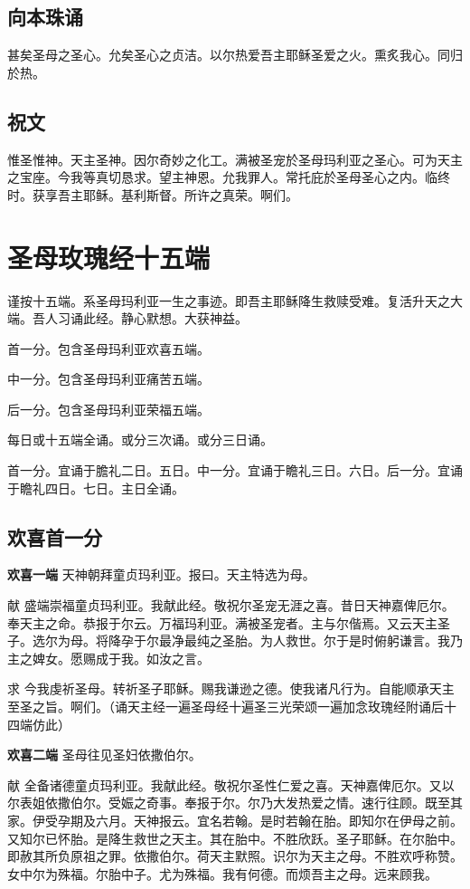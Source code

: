 \documentclass[UTF8,17pt]{ctexart}
\begin{document}
\subsection{向本珠诵}

甚矣圣母之圣⼼。允矣圣⼼之贞洁。以尔热爱吾主耶稣圣爱之⽕。熏炙我⼼。同归於热。

\subsection{祝⽂}

惟圣惟神。天主圣神。因尔奇妙之化⼯。满被圣宠於圣母玛利亚之圣⼼。可为天主之宝座。今我等真切恳求。望主神恩。允我罪⼈。常托庇於圣母圣⼼之内。临终时。获享吾主耶稣。基利斯督。所许之真荣。啊们。

\section{圣母玫瑰经⼗五端}

谨按⼗五端。系圣母玛利亚⼀⽣之事迹。即吾主耶稣降⽣救赎受难。复活升天之⼤端。吾⼈习诵此经。静⼼默想。⼤获神益。

⾸⼀分。包含圣母玛利亚欢喜五端。

中⼀分。包含圣母玛利亚痛苦五端。

后⼀分。包含圣母玛利亚荣福五端。

每⽇或⼗五端全诵。或分三次诵。或分三⽇诵。

⾸⼀分。宜诵于膽礼⼆⽇。五⽇。中⼀分。宜诵于瞻礼三⽇。六⽇。后⼀分。宜诵于瞻礼四⽇。七⽇。主⽇全诵。\Cross

\subsection{欢喜⾸⼀分}

\textbf{欢喜⼀端} \quad 天神朝拜童贞玛利亚。报曰。天主特选为母。

献 \quad 盛端崇福童贞玛利亚。我献此经。敬祝尔圣宠⽆涯之喜。昔⽇天神嘉俾厄尔。奉天主之命。恭报于尔云。万福玛利亚。满被圣宠者。主与尔偕焉。又云天主圣⼦。选尔为母。将降孕于尔最净最纯之圣胎。为⼈救世。尔于是时俯躬谦⾔。我乃主之婢⼥。愿赐成于我。如汝之⾔。

求 \quad 今我虔祈圣母。转祈圣⼦耶稣。赐我谦逊之德。使我诸凡⾏为。⾃能顺承天主⾄圣之旨。啊们。（诵天主经⼀遍圣母经⼗遍圣三光荣颂⼀遍加念玫瑰经附诵后⼗四端仿此）

\textbf{欢喜⼆端} \quad 圣母往见圣妇依撒伯尔。

献 \quad 全备诸德童贞玛利亚。我献此经。敬祝尔圣性仁爱之喜。天神嘉俾厄尔。又以尔表姐依撒伯尔。受娠之奇事。奉报于尔。尔乃⼤发热爱之情。速⾏往顾。既⾄其家。伊受孕期及六⽉。天神报云。宜名若翰。是时若翰在胎。即知尔在伊母之前。又知尔已怀胎。是降⽣救世之天主。其在胎中。不胜欣跃。圣⼦耶稣。在尔胎中。即赦其所负原祖之罪。依撒伯尔。荷天主默照。识尔为天主之母。不胜欢呼称赞。⼥中尔为殊福。尔胎中⼦。尤为殊福。我有何德。⽽烦吾主之母。远来顾我。
\end{document}
